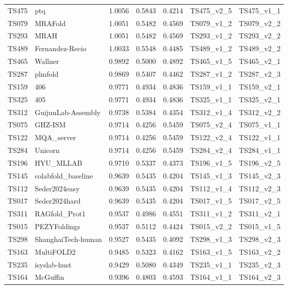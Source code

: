 \begin{table}[ht]
{\begin{tabular}{llrrrll}
TS475 & ptq & 1.0056 & 0.5843 & 0.4214 & TS475\_v2\_5 & TS475\_v1\_1 \\ 
TS079 & MRAFold & 1.0051 & 0.5482 & 0.4569 & TS079\_v1\_2 & TS079\_v2\_2 \\ 
TS293 & MRAH & 1.0051 & 0.5482 & 0.4569 & TS293\_v1\_2 & TS293\_v2\_2 \\ 
TS489 & Fernandez-Recio & 1.0033 & 0.5548 & 0.4485 & TS489\_v1\_2 & TS489\_v2\_2 \\ 
TS465 & Wallner & 0.9892 & 0.5000 & 0.4892 & TS465\_v1\_5 & TS465\_v2\_1 \\ 
TS287 & plmfold & 0.9869 & 0.5407 & 0.4462 & TS287\_v1\_2 & TS287\_v2\_3 \\ 
TS159 & 406 & 0.9771 & 0.4934 & 0.4836 & TS159\_v1\_1 & TS159\_v2\_1 \\ 
TS325 & 405 & 0.9771 & 0.4934 & 0.4836 & TS325\_v1\_1 & TS325\_v2\_1 \\ 
TS312 & GuijunLab-Assembly & 0.9738 & 0.5384 & 0.4354 & TS312\_v1\_4 & TS312\_v2\_2 \\ 
TS075 & GHZ-ISM & 0.9714 & 0.4256 & 0.5459 & TS075\_v2\_4 & TS075\_v1\_1 \\ 
TS122 & MQA\_server & 0.9714 & 0.4256 & 0.5459 & TS122\_v2\_4 & TS122\_v1\_1 \\ 
TS284 & Unicorn & 0.9714 & 0.4256 & 0.5459 & TS284\_v2\_4 & TS284\_v1\_1 \\ 
TS196 & HYU\_MLLAB & 0.9710 & 0.5337 & 0.4373 & TS196\_v1\_5 & TS196\_v2\_5 \\ 
TS145 & colabfold\_baseline & 0.9639 & 0.5435 & 0.4204 & TS145\_v1\_3 & TS145\_v2\_3 \\ 
TS112 & Seder2024easy & 0.9639 & 0.5435 & 0.4204 & TS112\_v1\_4 & TS112\_v2\_3 \\ 
TS017 & Seder2024hard & 0.9639 & 0.5435 & 0.4204 & TS017\_v1\_5 & TS017\_v2\_5 \\ 
TS311 & RAGfold\_Prot1 & 0.9537 & 0.4986 & 0.4551 & TS311\_v1\_2 & TS311\_v2\_1 \\ 
TS015 & PEZYFoldings & 0.9537 & 0.5112 & 0.4424 & TS015\_v2\_2 & TS015\_v1\_5 \\ 
TS298 & ShanghaiTech-human & 0.9527 & 0.5435 & 0.4092 & TS298\_v1\_3 & TS298\_v2\_3 \\ 
TS163 & MultiFOLD2 & 0.9485 & 0.5323 & 0.4162 & TS163\_v1\_5 & TS163\_v2\_2 \\ 
TS235 & isyslab-hust & 0.9429 & 0.5080 & 0.4349 & TS235\_v1\_1 & TS235\_v2\_3 \\ 
TS164 & McGuffin & 0.9396 & 0.4803 & 0.4593 & TS164\_v1\_1 & TS164\_v2\_3 \\ 

\end{tabular}}
\end{table}
